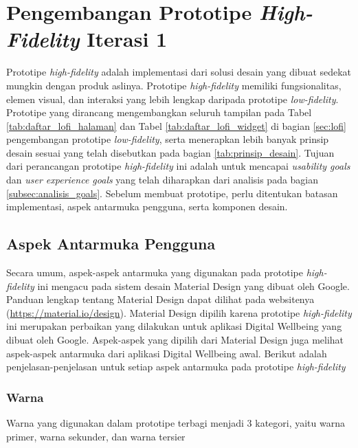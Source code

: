 
\section{Pengembangan Prototipe \textit{High-Fidelity} Iterasi 1}
\label{sec:hifi_1}

Prototipe \textit{high-fidelity} adalah implementasi dari solusi desain yang dibuat sedekat mungkin dengan produk aslinya. Prototipe \textit{high-fidelity} memiliki fungsionalitas, elemen visual, dan interaksi yang lebih lengkap daripada prototipe \textit{low-fidelity}. \parencite{PreeceRogersSharp15} Prototipe yang dirancang mengembangkan seluruh tampilan pada Tabel \ref{tab:daftar_lofi_halaman} dan Tabel \ref{tab:daftar_lofi_widget} di bagian \ref{sec:lofi} pengembangan prototipe \textit{low-fidelity}, serta menerapkan lebih banyak prinsip desain sesuai yang telah disebutkan pada bagian \ref{tab:prinsip_desain}. Tujuan dari perancangan prototipe \textit{high-fidelity} ini adalah untuk mencapai \textit{usability goals} dan \textit{user experience goals} yang telah diharapkan dari analisis pada bagian \ref{subsec:analisis_goals}. Sebelum membuat prototipe, perlu ditentukan batasan implementasi, aspek antarmuka pengguna, serta komponen desain.


\subsection{Aspek Antarmuka Pengguna}
\label{subsec:antarmuka}

Secara umum, aspek-aspek antarmuka yang digunakan pada prototipe \textit{high-fidelity} ini mengacu pada sistem desain Material Design yang dibuat oleh Google. Panduan lengkap tentang Material Design dapat dilihat pada websitenya (\href{https://material.io/design}{https://material.io/design}). Material Design dipilih karena prototipe \textit{high-fidelity} ini merupakan perbaikan yang dilakukan untuk aplikasi Digital Wellbeing yang dibuat oleh Google. Aspek-aspek yang dipilih dari Material Design juga melihat aspek-aspek antarmuka dari aplikasi Digital Wellbeing awal. Berikut adalah penjelasan-penjelasan untuk setiap aspek antarmuka pada prototipe \textit{high-fidelity}  

\subsubsection{Warna}
\label{subsubsec:aspek_warna}
Warna yang digunakan dalam prototipe terbagi menjadi 3 kategori, yaitu warna primer, warna sekunder, dan warna tersier

